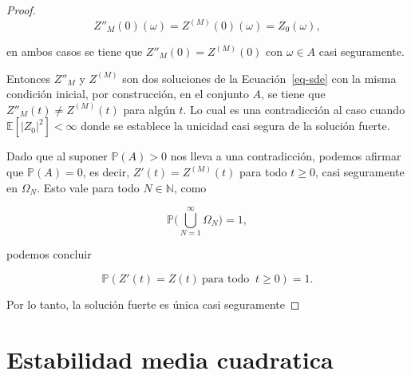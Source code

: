 \documentclass[
  spanish,
  us-letterpaper,
]{scrreprt}
\theoremstyle{plain}
\theoremstyle{plain}
\theoremstyle{definition}
\theoremstyle{plain}
\theoremstyle{remark}
\begin{document}
\begin{proof}
\[
    Z''_M(0)(\omega)=Z^{(M)}(0)(\omega)=Z_0(\omega),
\]

en ambos casos se tiene que \(Z''_M(0)=Z^{(M)}(0)\) con \(\omega\in A\)
casi seguramente.

Entonces \(Z''_M\) y \(Z^{(M)}\) son dos soluciones de la
Ecuación~\ref{eq-sde} con la misma condición inicial, por construcción,
en el conjunto \(A\), se tiene que \(Z''_M(t)\neq Z^{(M)}(t)\) para
algún \(t\). Lo cual es una contradicción al caso cuando
\(\mathbb{E}[|Z_0|^2]<\infty\) donde se establece la unicidad casi
segura de la solución fuerte.

Dado que al suponer \(\mathbb{P}(A)>0\) nos lleva a una contradicción,
podemos afirmar que \(\mathbb{P}(A)=0\), es decir, \(Z'(t)=Z^{(M)}(t)\)
para todo \(t\geq 0\), casi seguramente en \(\Omega_N\). Esto vale para
todo \(N\in \mathbb{N}\), como

\[
    \mathbb{P}\Bigg(\bigcup\limits_{N=1}^{\infty}\Omega_N\Bigg)=1,
\]

podemos concluir

\[
    \mathbb{P}(Z'(t)=Z(t)\ \text{para todo }\ t\geq 0)=1.
\]

Por lo tanto, la solución fuerte es única casi seguramente
\end{proof}


\chapter{Estabilidad media
cuadratica}\label{estabilidad-media-cuadratica}
\end{document}
